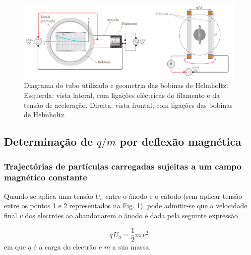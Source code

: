 \documentclass[a4paper,twoside,11pt]{report}      %
\begin{document}
\begin{figure}
	[h]  \centering 
	\includegraphics[width=1\textwidth]{fig5-TuboTL.pdf} 
	\caption{Diagrama do tubo utilizado e geometria das bobinas de Helmholtz. Esquerda: vista lateral, com ligações eléctricas do filamento e da tensão de aceleração. Direita: vista frontal, com ligações das bobinas de Helmholtz. \label{fig:TL}} 
\end{figure}

\subsection{\sf Determinação de $q/m$ por deflexão magnética}
\subsubsection{\sf Trajectórias de partículas carregadas sujeitas a um campo magnético constante}
Quando se aplica uma tensão $U_a$ entre o ânodo e o cátodo (sem aplicar tensão entre os pontos 1 e 2 representados na Fig. \ref{fig:TL}), pode admitir-se que a velocidade final $v$ dos electrões ao abandonarem o ânodo é dada pela seguinte expressão 

\begin{equation}
	\label{eq:encin11}
q\, U_a = \frac{1}{2} m \, v^2
\end{equation}
em que $q$  é a carga do electrão e $m$ a sua massa.
\end{document}
